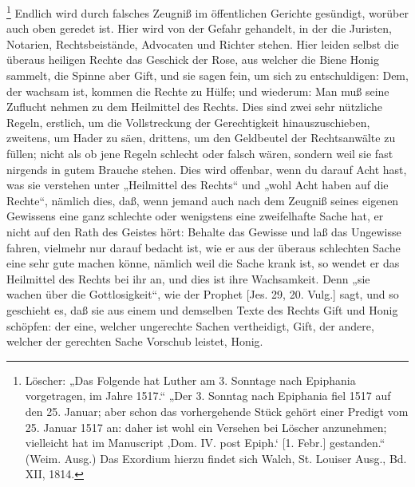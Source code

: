 \footnote{Löscher: „Das Folgende hat Luther am 3. Sonntage nach Epiphania vorgetragen, im Jahre 1517.“ „Der 3. Sonntag nach Epiphania fiel 1517 auf den 25. Januar; aber schon das vorhergehende Stück gehört einer Predigt vom 25. Januar 1517 an: daher ist wohl ein Versehen bei Löscher anzunehmen; vielleicht hat im Manuscript ‚Dom. IV. post Epiph.‘ [1. Febr.] gestanden.“ (Weim. Ausg.) Das Exordium hierzu findet sich Walch, St. Louiser Ausg., Bd. XII, 1814.} Endlich wird durch falsches Zeugniß im öffentlichen Gerichte gesündigt, worüber auch oben geredet ist. Hier wird von der Gefahr gehandelt, in der die Juristen, Notarien, Rechtsbeistände, Advocaten und Richter stehen. Hier leiden selbst die überaus heiligen Rechte das Geschick der Rose, aus welcher die Biene Honig sammelt, die Spinne aber Gift, und sie sagen fein, um sich zu entschuldigen: Dem, der wachsam ist, kommen die Rechte zu Hülfe; und wiederum: Man muß seine Zuflucht nehmen zu dem Heilmittel des Rechts. Dies sind zwei sehr nützliche Regeln, erstlich, um die Vollstreckung der Gerechtigkeit hinauszuschieben, zweitens, um Hader zu säen, drittens, um den Geldbeutel der Rechtsanwälte zu füllen; nicht als ob jene Regeln schlecht oder falsch wären, sondern weil sie fast nirgends in gutem Brauche stehen. Dies wird offenbar, wenn du darauf Acht hast, was sie verstehen unter „Heilmittel des Rechts“ und „wohl Acht haben auf die Rechte“, nämlich dies, daß, wenn jemand auch nach dem Zeugniß seines eigenen Gewissens eine ganz schlechte oder wenigstens eine zweifelhafte Sache hat, er nicht auf den Rath des Geistes hört: Behalte das Gewisse und laß das Ungewisse fahren, vielmehr nur darauf bedacht ist, wie er aus der überaus schlechten Sache eine sehr gute machen könne, nämlich weil die Sache krank ist, so wendet er das Heilmittel des Rechts bei ihr an, und dies ist ihre Wachsamkeit. Denn „sie wachen über die Gottlosigkeit“, wie der Prophet [Jes. 29, 20. Vulg.] sagt, und so geschieht es, daß sie aus einem und demselben Texte des Rechts Gift und Honig schöpfen: der eine, welcher ungerechte Sachen vertheidigt, Gift, der andere, welcher der gerechten Sache Vorschub leistet, Honig.

